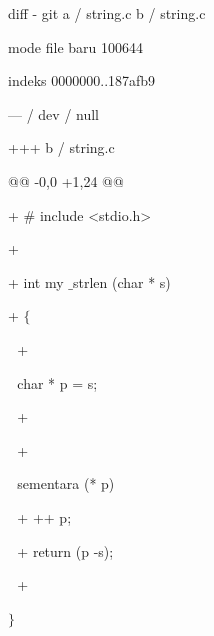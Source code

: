  \vspace{\baselineskip}
 \vspace{12pt}
\noindent 
 \hspace*{0.5in} diff - git a / string.c b / string.c \par
\noindent 
 \hspace*{0.5in} mode file baru 100644 \par
\noindent 
 \hspace*{0.5in} indeks 0000000..187afb9 \par
\noindent 
 \hspace*{0.5in} --- / dev / null \par
\noindent 
 \hspace*{0.5in} +++ b / string.c \par
\noindent 
 \hspace*{0.5in} @@ -0,0 +1,24 @@ \par
\noindent 
 \hspace*{0.5in} +  $  \#  $ include <stdio.h> \par
\noindent 
 \hspace*{0.5in} + \par
\noindent 
 \hspace*{0.5in} + int my $  \_  $strlen (char * s) \par
\noindent 
 \hspace*{0.5in} +  $  \{  $ \par
\noindent 
 \hspace*{0.5in}  $  $ $  $ $  $+ \par
\noindent 
 \hspace*{0.5in}  $  $ $  $ $  $char * p = s; \par
\noindent 
 \hspace*{0.5in}  $  $ $  $ $  $+ \par
\noindent 
 \hspace*{0.5in}  $  $ $  $ $  $+ \par
\noindent 
 \hspace*{0.5in}  $  $ $  $ $  $sementara (* p) \par
\noindent 
 \hspace*{0.5in}  $  $ $  $ $  $+ ++ p; \par
\noindent 
 \hspace*{0.5in}  $  $ $  $ $  $+ return (p -s); \par
\noindent 
 \hspace*{0.5in}  $  $ $  $ $  $+ \par
\noindent 
 \hspace*{0.5in}  $  \}  $ \par
